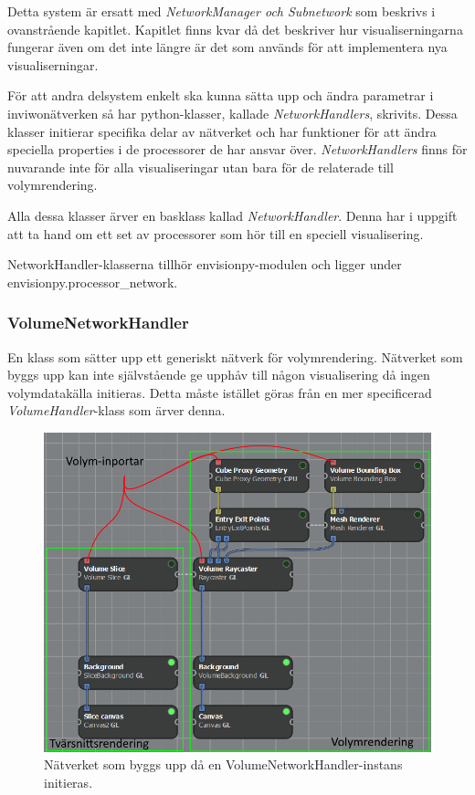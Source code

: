 \documentclass[10pt,oneside,swedish]{article}
\begin{document}
Detta system är ersatt med \emph{NetworkManager och Subnetwork} som beskrivs i ovanstrående kapitlet. Kapitlet finns kvar då det
beskriver hur visualiserningarna fungerar även om det inte längre är det
som används för att implementera nya visualiserningar.

För att andra delsystem enkelt ska kunna sätta upp och ändra parametrar
i inviwonätverken så har python-klasser, kallade \emph{NetworkHandlers},
skrivits. Dessa klasser initierar specifika delar av nätverket och har
funktioner för att ändra speciella properties i de processorer de har
ansvar över. \emph{NetworkHandlers} finns för nuvarande inte för alla
visualiseringar utan bara för de relaterade till volymrendering.

Alla dessa klasser ärver en basklass kallad \emph{NetworkHandler}. Denna
har i uppgift att ta hand om ett set av processorer som hör till en
speciell visualisering.

NetworkHandler-klasserna tillhör envisionpy-modulen och ligger under
envisionpy.processor\_network.

\subsubsection{VolumeNetworkHandler}\label{volumenetworkhandler}

En klass som sätter upp ett generiskt nätverk för volymrendering.
Nätverket som byggs upp kan inte självstående ge upphåv till någon
visualisering då ingen volymdatakälla initieras. Detta måste istället
göras från en mer specificerad \emph{VolumeHandler}-klass som ärver
denna.

\begin{figure}[H]
\centering
\includegraphics[width=1.00000\textwidth]{Images/volume_network_ex.PNG}
\caption{Nätverket som byggs upp då en VolumeNetworkHandler-instans
initieras.}
\label{fig:VolumeNetworkHandler}
\end{figure}
\end{document}
